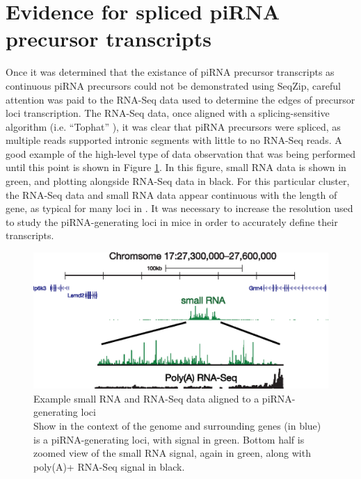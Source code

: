 \section{Evidence for spliced piRNA precursor transcripts}
  \label{SeqZipMethod:sec:piRNA precursors are spliced}

  Once it was determined that the existance of piRNA precursor transcripts as continuous piRNA precursors could not be demonstrated using SeqZip, careful attention was paid to the RNA-Seq data used to determine the edges of precursor loci transcription. The RNA-Seq data, once aligned with a splicing-sensitive algorithm (i.e. ``Tophat'' \citep{Trapnell2009}), it was clear that piRNA precursors were spliced, as multiple reads supported intronic segments with little to no RNA-Seq reads. A good example of the high-level type of data observation that was being performed until this point is shown in Figure \ref{SeqZipMethod:fig:evidence for precusor splicing}. In this figure, small RNA data is shown in green, and plotting alongside RNA-Seq data in black. For this particular cluster, the RNA-Seq data and small RNA data appear continuous with the length of gene, as typical for many loci in \flies{}. It was necessary to increase the resolution used to study the piRNA-generating loci in mice in order to accurately define their transcripts.

  \begin{figure} %
    \centering 
    \includegraphics{Figures/SeqZipMethod/evidenceForPrecursorSplicing.eps}
    \caption[Example small RNA and RNA-Seq data aligned to a piRNA-generating loci]
    {
      Example small RNA and RNA-Seq data aligned to a piRNA-generating loci\\[0.25cm]
      Show in the context of the genome and surrounding genes (in blue) is a piRNA-generating loci, with signal in green. Bottom half is zoomed view of the small RNA signal, again in green, along with poly(A)+ RNA-Seq signal in black.
      }
    \label{SeqZipMethod:fig:evidence for precusor splicing}
    \end{figure}

